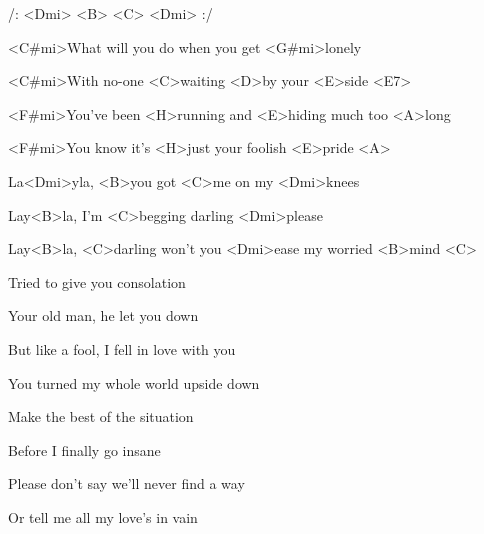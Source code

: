 

/: <Dmi> <B> <C> <Dmi> :/

\zs
<C#mi>What will you do when you get <G#mi>lonely

<C#mi>With no-one <C>waiting <D>by your <E>side <E7>

<F#mi>You've been <H>running and <E>hiding much too <A>long

<F#mi>You know it's <H>just your foolish <E>pride <A>
\ks

\zr
La<Dmi>yla, <B>you got <C>me on my <Dmi>knees

Lay<B>la, I'm <C>begging darling <Dmi>please

Lay<B>la, <C>darling won't you <Dmi>ease my worried <B>mind <C>
\kr

\zs
Tried to give you consolation

Your old man, he let you down

But like a fool, I fell in love with you

You turned my whole world upside down
\ks

\zr \kr

\zs
Make the best of the situation

Before I finally go insane

Please don't say we'll never find a way

Or tell me all my love's in vain
\ks

\zr \kr

\kp






















